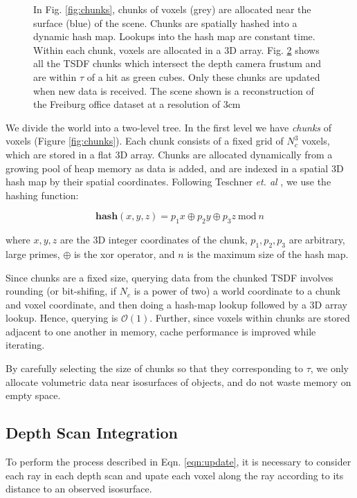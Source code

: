 \documentclass[10pt,twocolumn,letterpaper]{article}
\begin{document}
\begin{figure}
\begin{subfigure}{0.48\columnwidth}
      \caption{}
 	 \label{fig:frustum_cull}
  \end{subfigure}
  \caption{In Fig. \ref{fig:chunks}, chunks of voxels (grey) are allocated near
  the surface (blue) of the scene. Chunks are spatially hashed \cite{SpatialHashing} into a
      dynamic hash map. Lookups into the hash map are constant time. Within each
      chunk, voxels are allocated in a 3D array. Fig.
      \ref{fig:frustum_cull} shows all the TSDF chunks which intersect the depth
      camera frustum  and are within $\tau$ of a hit as green cubes. Only these
      chunks are updated when new data is received. The scene shown is a
      reconstruction of the Freiburg office \cite{FREIBURG} dataset at a
      resolution of 3cm}
\end{figure} 

We divide the world into a two-level tree. In the first level we have
\emph{chunks} of voxels (Figure \ref{fig:chunks}). Each chunk consists of a
fixed grid of $N_c^3$ voxels, which are stored in a flat 3D array. Chunks are
allocated dynamically from a growing pool of heap memory as data is added, and
are indexed in a spatial 3D hash map \cite{SpatialHashing} by their spatial
coordinates. Following Teschner \emph{et. al} \cite{SpatialHashing}, we use the
hashing function:

\begin{equation}
\textbf{hash}(x, y, z) = p_1 x\oplus p_2 y \oplus p_3 z
~\text{mod}~n
\end{equation}

\noindent where $x, y, z$ are the 3D integer coordinates of the chunk, $p_1,
p_2, p_3$ are arbitrary, large primes, $\oplus$ is the xor operator, and $n$ is
the maximum size of the hash map.

Since chunks are a fixed size, querying data from the chunked TSDF involves
rounding (or bit-shifing, if $N_c$ is a power of two) a world coordinate to a
chunk and voxel coordinate, and then doing a hash-map lookup followed by a 3D
array lookup. Hence, querying is $\mathcal{O}(1)$. Further, since voxels within
chunks are stored adjacent to one another in memory, cache performance is
improved while iterating.

By carefully selecting the size of chunks so that they corresponding to $\tau$,
we only allocate volumetric data near isosurfaces of objects, and do not waste
memory on empty space.

\subsection{Depth Scan Integration}
\label{section:scan_integration}
To perform the process described in Eqn. \ref{eqn:update}, it is necessary
to consider each ray in each depth scan and upate each voxel
along the ray according to its distance to an observed isosurface.
\end{document}
